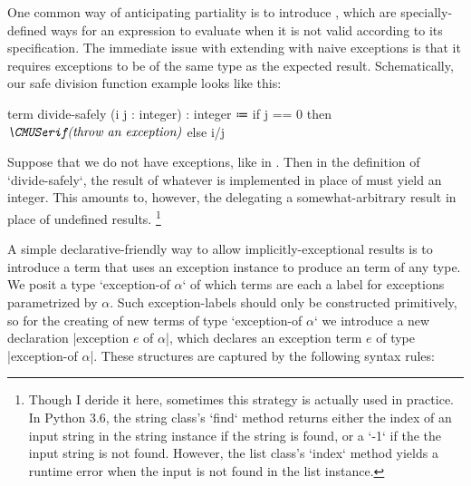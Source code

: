 One common way of anticipating partiality is to introduce ,
which are specially-defined ways for an expression to evaluate when it is not valid according to its specification.
The immediate issue with extending \LangA with naive exceptions is that it requires exceptions to be of the same type as the expected result.
Schematically, our safe division function example looks like this:
\begin{snippet}
term divide-safely (i j : integer) : integer
  ≔ if j == 0
      then $\normtextit{(throw an exception)}$
      else i/j
\end{snippet}
Suppose that we do not have exceptions, like in \LangA.
Then in the definition of \code`divide-safely`, the result of whatever is implemented in place of  must yield an integer.
This amounts to, however, the delegating a somewhat-arbitrary result in place of undefined results.%
\footnote{
  Though I deride it here, sometimes this strategy is actually used in practice. In Python 3.6, the string class's \code`find` method returns either the index of an input string in the string instance if the string is found, or a \code`-1` if the the input string is not found. However, the list class's \code`index` method yields a runtime error when the input is not found in the list instance.
}

A simple declarative-friendly way to allow implicitly-exceptional results is to introduce a term that uses an exception instance to produce an  term of any type.
We posit a type \code`exception-of $α$` of which terms are each a label for exceptions parametrized by $α$.
Such exception-labels should only be constructed primitively, so for the creating of new terms of type \code`exception-of $α$` we introduce a new declaration \code|exception $e$ of $α$|,
which declares an exception term $e$ of type \code|exception-of $α$|.
These structures are captured by the following syntax rules:


